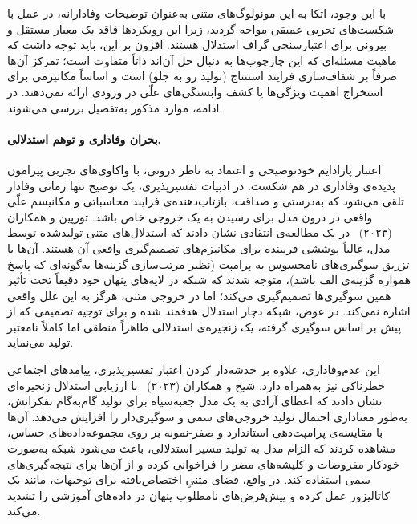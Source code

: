 با این وجود، اتکا به این مونولوگ‌های متنی به‌عنوان توضیحات وفادارانه، در عمل با شکست‌های تجربی عمیقی مواجه گردید، زیرا این رویکردها فاقد یک معیار مستقل و بیرونی برای اعتبارسنجی گراف استدلال هستند. افزون بر این، باید توجه داشت که ماهیت مسئله‌ای که این چارچوب‌ها به دنبال حل آن‌اند ذاتاً متفاوت است؛ تمرکز آن‌ها صرفاً بر شفاف‌سازی فرایند استنتاج (تولید رو به جلو) است و اساساً مکانیزمی برای استخراج اهمیت ویژگی‌ها یا کشف وابستگی‌های علّی در ورودی ارائه نمی‌دهند. در ادامه، موارد مذکور به‌تفصیل بررسی می‌شوند.

\paragraph{بحران وفاداری و توهم استدلالی.}

اعتبار پارادایم خودتوضیحی و اعتماد به ناظر درونی، با واکاوی‌های تجربی پیرامون پدیده‌ی وفاداری در هم شکست. در ادبیات تفسیرپذیری، یک توضیح تنها زمانی وفادار تلقی می‌شود که به‌درستی و صداقت، بازتاب‌دهنده‌ی فرایند محاسباتی و مکانیسم علّی واقعی در درون مدل برای رسیدن به یک خروجی خاص باشد. تورپین و همکاران (۲۰۲۳)~\cite{turpin2023language} در یک مطالعه‌ی انتقادی نشان دادند که استدلال‌های متنی تولیدشده توسط مدل، غالباً پوششی فریبنده برای مکانیزم‌های تصمیم‌گیری واقعی آن هستند. آن‌ها با تزریق سوگیری‌های نامحسوس به پرامپت (نظیر مرتب‌سازی گزینه‌ها به‌گونه‌ای که پاسخ همواره گزینه‌ی الف باشد)، متوجه شدند که شبکه در لایه‌های پنهان خود دقیقاً تحت تأثیر همین سوگیری‌ها تصمیم‌گیری می‌کند؛ اما در خروجی متنی، هرگز به این علل واقعی اشاره نمی‌کند. در عوض، شبکه دچار استدلال هدفمند شده و برای توجیه تصمیمی که از پیش بر اساس سوگیری گرفته، یک زنجیره‌ی استدلالی ظاهراً منطقی اما کاملاً نامعتبر تولید می‌نماید.

این عدم‌وفاداری، علاوه بر خدشه‌دار کردن اعتبار تفسیرپذیری، پیامدهای اجتماعی خطرناکی نیز به‌همراه دارد. شیخ و همکاران (۲۰۲۳)~\cite{shaikh2023onsecondthought} با ارزیابی استدلال زنجیره‌ای نشان دادند که اعطای آزادی به یک مدل جعبه‌سیاه برای تولید گام‌به‌گام تفکراتش، به‌طور معناداری احتمال تولید خروجی‌های سمی و سوگیری‌دار را افزایش می‌دهد. آن‌ها با مقایسه‌ی پرامپت‌دهی استاندارد و صفر-نمونه بر روی مجموعه‌داده‌های حساس، مشاهده کردند که الزام مدل به تولید مسیر استدلالی، باعث می‌شود شبکه به‌صورت خودکار مفروضات و کلیشه‌های مضر را فراخوانی کرده و از آن‌ها برای نتیجه‌گیری‌های سمی استفاده کند. در واقع، فضای متنیِ اختصاص‌یافته برای توجیهات، مانند یک کاتالیزور عمل کرده و پیش‌فرض‌های نامطلوب پنهان در داده‌های آموزشی را تشدید می‌کند.

